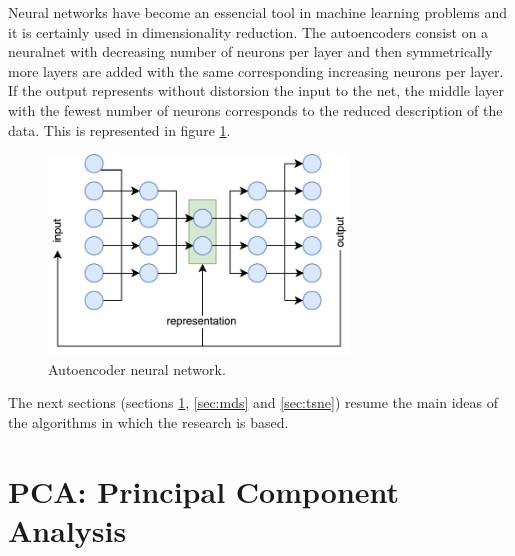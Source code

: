 \documentclass[a4paper,11pt,spanish]{report}
\begin{document}
Neural networks have become an essencial tool in machine learning problems and it is certainly used in dimensionality reduction. The autoencoders \citep{auto2, auto} consist on a neuralnet with decreasing number of neurons per layer and then symmetrically more layers are added with the same corresponding increasing neurons per layer. If the output represents without distorsion the input to the net, the middle layer with the fewest number of neurons corresponds to the reduced description of the data. This is represented in figure \ref{autoencoder}.

\begin{figure}[h]
\centering
\includegraphics[width=8cm]{figures/autoencoder.pdf}
\caption{\label{autoencoder}Autoencoder neural network.}
\end{figure}

The next sections (sections \ref{sec:pca}, \ref{sec:mds} and \ref{sec:tsne}) resume the main ideas of the algorithms in which the research is based. 

\section{PCA: Principal Component Analysis}
\label{sec:pca}
\end{document}
